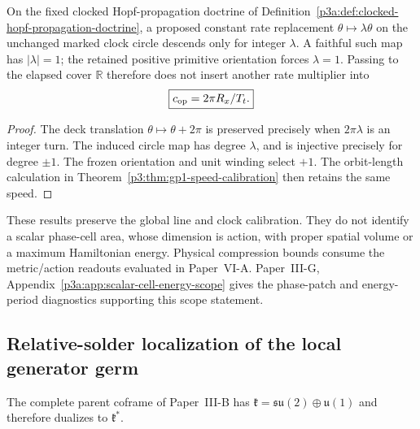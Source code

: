 \documentclass[12pt,a4paper]{article}
\begin{document}
\begin{corollary}
\label{p3a:cor:faithful-clock-real-cover}
On the fixed clocked Hopf-propagation doctrine of
Definition~\ref{p3a:def:clocked-hopf-propagation-doctrine}, a proposed constant
rate replacement \(\theta\mapsto\lambda\theta\) on the unchanged marked
clock circle descends only for integer \(\lambda\). A faithful such map
has \(|\lambda|=1\); the retained positive primitive orientation forces
\(\lambda=1\). Passing to the elapsed cover \(\mathbb R\) therefore does
not insert another rate multiplier into
\[
 \boxed{c_{\rm op}=2\pi R_x/T_t.}
\]
\end{corollary}
\begin{proof}
The deck translation \(\theta\mapsto\theta+2\pi\) is preserved precisely
when \(2\pi\lambda\) is an integer turn. The induced circle map has degree
\(\lambda\), and is injective precisely for degree \(\pm1\). The frozen
orientation and unit winding select \(+1\). The orbit-length calculation
in Theorem~\ref{p3:thm:gp1-speed-calibration} then retains the same speed.
\end{proof}

These results preserve the global line and clock calibration. They do not
identify a scalar phase-cell area, whose dimension is action, with proper
spatial volume or a maximum Hamiltonian energy. Physical compression bounds
consume the metric/action readouts evaluated in Paper~VI-A. Paper~III-G, Appendix~\ref{p3a:app:scalar-cell-energy-scope} gives the phase-patch and energy-period
diagnostics supporting this scope statement.


\subsection{Relative-solder localization of the local generator germ}
\label{p3a:sec:v187-m8-relative-solder-localization}
The complete parent coframe of Paper~III-B has
$\mathfrak k=\mathfrak{su}(2)\oplus\mathfrak u(1)$ and therefore dualizes to
$\mathfrak k^*$.  %
\end{document}
